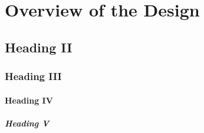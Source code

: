 \section{Overview of the Design}
\subsection{Heading II}
\subsubsection{Heading III}
\paragraph{Heading IV}
\subparagraph{Heading V}
